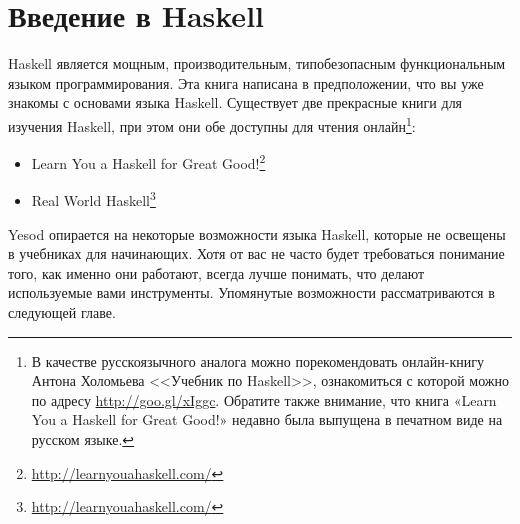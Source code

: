 \section{Введение в Haskell}

Haskell является мощным, производительным, типобезопасным функциональным языком программирования. Эта книга написана в предположении, что вы уже знакомы с основами языка Haskell. Существует две прекрасные книги для изучения Haskell, при этом они обе доступны для чтения онлайн\footnote{В качестве русскоязычного аналога можно порекомендовать онлайн-книгу Антона Холомьева <<Учебник по Haskell>>, ознакомиться с которой можно по адресу \href{http://goo.gl/xIggc}{http://goo.gl/xIggc}. Обратите также внимание, что книга «Learn You a Haskell for Great Good!» недавно была выпущена в печатном виде на русском языке.}:

\begin{itemize}
  \item Learn You a Haskell for Great Good!\footnote{\href{http://learnyouahaskell.com/}{http://learnyouahaskell.com/}}
  \item Real World Haskell\footnote{\href{http://learnyouahaskell.com/}{http://learnyouahaskell.com/}}
\end{itemize}

Yesod опирается на некоторые возможности языка Haskell, которые не освещены в учебниках для начинающих. Хотя от вас не часто будет требоваться понимание того, как именно они работают, всегда лучше понимать, что делают используемые вами инструменты. Упомянутые возможности рассматриваются в следующей главе.

